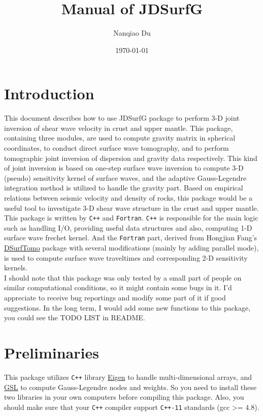 \documentclass[UTF8]{article}
\title{Manual of JDSurfG}
\author{Nanqiao Du}
\date{\today}
\begin{document}
   \maketitle
   \tableofcontents
   \newpage
   \section{Introduction}
   This document describes how to use JDSurfG package to perform 3-D joint inversion of 
   shear wave velocity in crust and upper mantle. This package, containing three modules, are 
   used to compute gravity matrix in spherical coordinates, to conduct direct surface wave 
   tomography, and to perform tomographic joint inversion of dispersion and gravity data 
   respectively. This kind of joint inversion is based on one-step surface wave 
   inversion to compute 3-D (pseudo) sensitivity kernel of surface waves, and the adaptive 
   Gauss-Legendre integration method is utilized to handle the gravity part. Based on 
   empirical relations between seismic velocity and density of rocks, this package would be 
   a useful tool to investigate 3-D shear wave structure in the crust and upper mantle.\\

   This package is written by \verb!C++! and \verb!Fortran!. \verb!C++! is responsible for the main logic such as 
   handling I/O, providing useful data structures and also, computing 1-D surface 
   wave frechet kernel. And the \verb!Fortran! part, derived from Hongjian Fang's 
   \href{https://github.com/HongjianFang/DSurfTomo/tree/stable/src}{DSurfTomo} package 
   with several modifications (mainly by adding parallel mode), 
   is used to compute surface wave traveltimes and corresponding
   2-D sensitivity kernels.\\

   I should note that this package was only tested by a small part of people on similar computational
   conditions, so it might contain some bugs in it. I'd appreciate to receive bug reportings 
   and modify some part of it if good suggestions. In the long term, I would add some new functions 
   to this package, you could see the TODO LIST in README.

   \section{Preliminaries}
   This package utilizes \verb!C++!  library \href{http://eigen.tuxfamily.org/index.php?title=Main_Page}{Eigen}
   to handle multi-dimensional arrays, and \href{http://www.gnu.org/software/gsl/}{GSL} to compute 
   Gauss-Legendre nodes and weights. So you need to install these two libraries in your own 
   computers before compiling this package. Also, you should make sure that your \verb!C++! compiler 
   support \verb!C++-11! standards (gcc >= 4.8).
\end{document}
